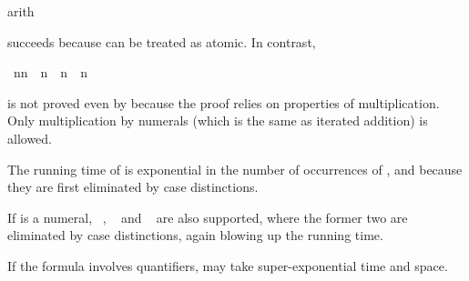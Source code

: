 \begin{isabellebody}
%
\isatagproof
\isamarkupfalse%
arith{\isacharparenright}%
\endisatagproof
{\isafoldproof}%
%
\isadelimproof
%
\endisadelimproof
\isamarkuptrue%
%
\begin{isamarkuptext}%
\noindent
succeeds because  can be treated as atomic. In contrast,%
\end{isamarkuptext}%
\isamarkupfalse%
\ {\isachardoublequote}n{\isacharasterisk}n\ {\isacharequal}\ n\ {\isasymLongrightarrow}\ n{\isacharequal}{}\ {\isasymor}\ n{\isacharequal}{}{\isachardoublequote}%
\isadelimproof
%
\endisadelimproof
%
\isatagproof
%
\endisatagproof
{\isafoldproof}%
%
\isadelimproof
%
\endisadelimproof
\isamarkuptrue%
%
\begin{isamarkuptext}%
\noindent
is not proved even by  because the proof relies 
on properties of multiplication. Only multiplication by numerals (which is
the same as iterated addition) is allowed.

\begin{warn} The running time of  is exponential in the number
  of occurrences of ,  and
   because they are first eliminated by case distinctions.

If  is a numeral, ~, ~ and
~ are also supported, where the former two are eliminated
by case distinctions, again blowing up the running time.

If the formula involves quantifiers,  may take
super-exponential time and space.
\end{warn}%
\end{isamarkuptext}%
%
\isadelimtheory
%
\endisadelimtheory
%
\isatagtheory
%
\endisatagtheory
{\isafoldtheory}%
%
\isadelimtheory
%
\endisadelimtheory
\end{isabellebody}%
